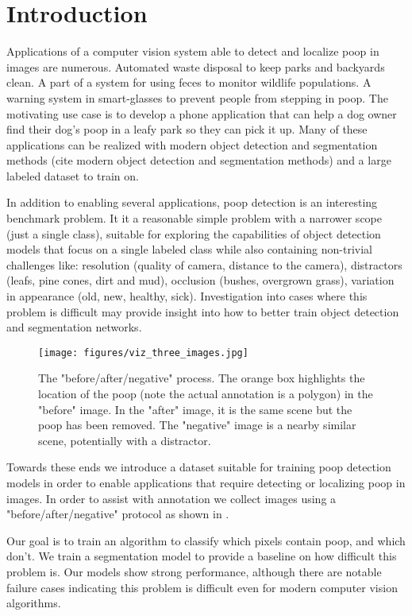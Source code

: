 \documentclass[10pt,twocolumn,letterpaper]{article}
\begin{document}
\section{Introduction}
\label{sec:intro}

Applications of a computer vision system able to detect and localize poop in
images are numerous.
Automated waste disposal to keep parks and backyards clean.
A part of a system for using feces to monitor wildlife populations.
A warning system in smart-glasses to prevent people from stepping in poop.
The motivating use case is to develop a phone application that can help a dog
owner find their dog's poop in a leafy park so they can pick it up.
Many of these applications can be realized with modern object detection and
segmentation methods (cite modern object detection and segmentation methods)
and a large labeled dataset to train on.


In addition to enabling several applications, poop detection is an interesting benchmark problem. 
It it a reasonable simple problem with a narrower scope (just a single class),
suitable for exploring the capabilities of object detection models that focus
on a single labeled class while also containing non-trivial challenges like:
resolution (quality of camera, distance to the camera),
distractors (leafs, pine cones, dirt and mud),
occlusion (bushes, overgrown grass),
variation in appearance (old, new, healthy, sick).
Investigation into cases where this problem is difficult may provide insight
into how to better train object detection and segmentation networks.


\begin{figure}[ht]
\centering
\texttt{[image: figures/viz\_three\_images.jpg]}
\caption[]{
    The "before/after/negative" process.
    The orange box highlights the location of the poop (note the
    actual annotation is a polygon) in the "before" image.
    In the "after" image, it is the same scene but the poop has been removed.
    The "negative" image is a nearby similar scene, potentially with a distractor.
}
\label{fig:ThreeImages}
\end{figure}

Towards these ends we introduce a dataset suitable for training poop detection
models in order to enable applications that require detecting or localizing
poop in images. In order to assist with annotation we collect images using a
"before/after/negative" protocol as shown in . 

Our goal is to train an algorithm to classify which pixels contain poop, and
which don't. We train a segmentation model to provide a baseline on how
difficult this problem is. Our models show strong performance, although there
are notable failure cases indicating this problem is difficult even for modern
computer vision algorithms.
\end{document}
